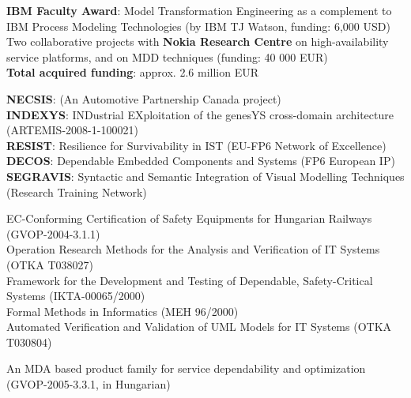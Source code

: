 \documentclass{xetexCV}
\begin{document}
\textbf{IBM Faculty Award}: Model Transformation Engineering as a
complement to IBM Process Modeling Technologies (by IBM TJ Watson, 
funding: 6,000 USD)  \\

Two collaborative projects with \textbf{Nokia Research Centre}
on high-availability service platforms, and on MDD%
techniques (funding: 40 000 EUR)\\

\textbf{Total acquired funding}: approx. 2.6 million EUR 


\textbf{NECSIS}:  (An Automotive Partnership Canada project)  \\
\textbf{INDEXYS}: INDustrial EXploitation of the genesYS
cross-domain architecture (ARTEMIS-2008-1-100021)  \\
\textbf{RESIST}: Resilience for Survivability in IST (EU-FP6
Network of Excellence)  \\
\textbf{DECOS}: Dependable Embedded Components and Systems (FP6
European IP) \\
\textbf{SEGRAVIS}: Syntactic and Semantic Integration of
Visual Modelling Techniques (Research Training Network) 


EC-Conforming  Certification of Safety Equipments for Hungarian
Railways (GVOP-2004-3.1.1) \\
Operation Research Methods  for the Analysis and Verification
of IT Systems (OTKA T038027) \\ 
Framework  for the Development and Testing of Dependable,
Safety-Critical Systems (IKTA-00065/2000) \\  
Formal Methods in Informatics (MEH 96/2000)  \\
Automated Verification  and Validation of UML Models for IT
Systems (OTKA T030804) 


An MDA based product family for service dependability and
optimization (GVOP-2005-3.3.1, in Hungarian)  
\end{document}
